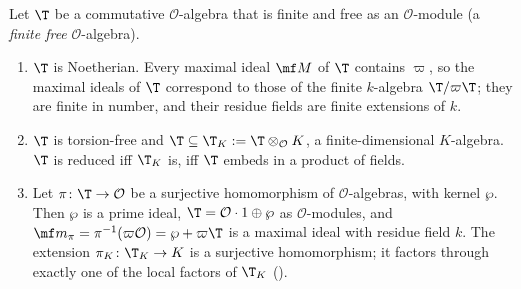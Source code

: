 \begin{theorem}\label{thm:modules:finite-algebra-dvr}
Let $\T$ be a commutative $\mathcal O$-algebra that is finite and free as an $\mathcal O$-module (a \emph{finite free} $\mathcal O$-algebra).
\begin{enumerate}[label=(\roman*)]
\item $\T$ is Noetherian. Every maximal ideal $\mf M$ of $\T$ contains $\varpi$, so the maximal ideals of $\T$ correspond to those of the finite
$k$-algebra $\T/\varpi\T$; they are finite in number, and their residue fields are finite extensions of $k$.
\item $\T$ is torsion-free and $\T\subseteq\T_K:=\T\otimes_{\mathcal O}K$, a finite-dimensional $K$-algebra. $\T$ is reduced iff $\T_K$ is, iff $\T$ embeds in a product
of fields.
\item Let $\pi\colon\T\to\mathcal O$ be a surjective homomorphism of $\mathcal O$-algebras, with kernel $\wp$. Then $\wp$ is a prime ideal, $\T=\mathcal O\cdot1\oplus\wp$ as
$\mathcal O$-modules, and $\mf m_\pi=\pi^{-1}(\varpi\mathcal O)=\wp+\varpi\T$ is a maximal ideal with residue field $k$. The extension $\pi_K\colon\T_K\to K$ is a surjective
homomorphism; it factors through exactly one of the local factors of $\T_K$ ().
\end{enumerate}
\end{theorem}


